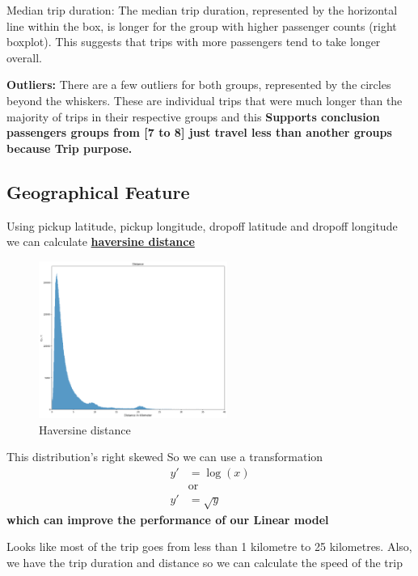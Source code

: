 \documentclass[twocolumn, 9pt]{extarticle}
\begin{document}
\hfill \break
Median trip duration: The median trip duration, represented by the horizontal line within the box, is longer for the group with higher passenger counts (right boxplot). This suggests that trips with more passengers tend to take longer overall.

\hfill \break
\textbf{Outliers:} There are a few outliers for both groups, represented by the circles beyond the whiskers. These are individual trips that were much longer than the majority of trips in their respective groups and this \textbf{Supports conclusion passengers groups from [7 to 8] just travel less than another groups because Trip purpose.}

\newpage
\subsection{Geographical Feature}

Using pickup latitude, pickup longitude, dropoff latitude and dropoff longitude we can calculate \href{https://en.wikipedia.org/wiki/Haversine_formula}{\textbf{haversine distance}}

\begin{figure}[ht]
\centering
    \includegraphics[width=0.55\textwidth, height=0.3\textheight]{haversine distance.png}
    \caption{\label{fig:distance}Haversine distance}
\end{figure}

\hfill \break
This distribution's right skewed So we can use a transformation
\[
\begin{aligned}
y' &= \log(x) \\
   &\text{or} \\
y' &= \sqrt{y}
\end{aligned}
\]
\textbf{which can improve the performance of our Linear model}

\hfill \break
Looks like most of the trip goes from less than 1 kilometre to 25 kilometres. Also, we have the trip duration and distance so we can calculate the speed of the trip
\end{document}
